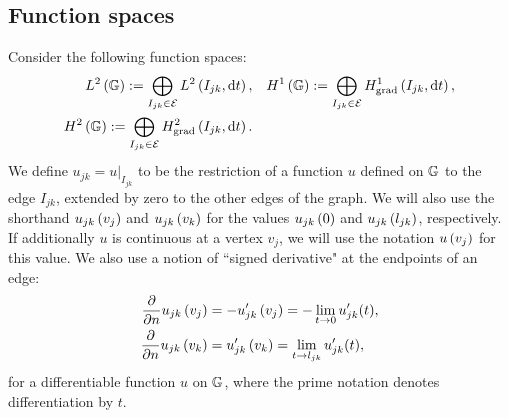 \subsection{Function spaces} \label{ssec:FunctionSpaces}
Consider the following function spaces:
\begin{subequations} \label{eq:GraphFuncSpaces}
	\begin{align}
		L^2\left( \mathbb{G} \right) := \bigoplus_{I_{jk}\in \mathcal{E}} L^{2}\left( I_{jk},\mathrm{d}t \right),
		&\quad H^1\left( \mathbb{G} \right) := \bigoplus_{I_{jk}\in \mathcal{E}} H^1_\mathrm{grad}\left( I_{jk}, \mathrm{d}t \right), \\
		H^2\left( \mathbb{G} \right) := \bigoplus_{I_{jk}\in \mathcal{E}} H^2_\mathrm{grad}\left( I_{jk}, \mathrm{d} t \right). &
	\end{align}
\end{subequations}
We define $u_{jk} = u\vert_{I_{jk}}$ to be the restriction of a function $u$ defined on $\mathbb{G}$ to the edge $I_{jk}$, extended by zero to the other edges of the graph.
We will also use the shorthand $u_{jk}\left( v_j \right)$ and $u_{jk}\left( v_k \right)$ for the values $u_{jk}\left( 0 \right)$ and $u_{jk}\left( l_{jk} \right)$, respectively.
If additionally $u$ is continuous at a vertex $v_j$, we will use the notation $u\left( v_j \right)$ for this value.
We also use a notion of ``signed derivative" at the endpoints of an edge:
\begin{subequations} \label{eq:SignedDerivConvention}
	\begin{align}
		\dfrac{\partial }{\partial n}u_{jk}\left( v_j \right) &= -u_{jk}'\left( v_j \right) = -\lim_{t\rightarrow0}u_{jk}'(t), \\
		\dfrac{\partial }{\partial n}u_{jk}\left( v_k \right) &= u_{jk}'\left( v_k \right) = \lim_{t\rightarrow l_{jk}}u_{jk}'(t),
	\end{align}
\end{subequations}
for a differentiable function $u$ on $\mathbb{G}$, where the prime notation denotes differentiation by $t$.
